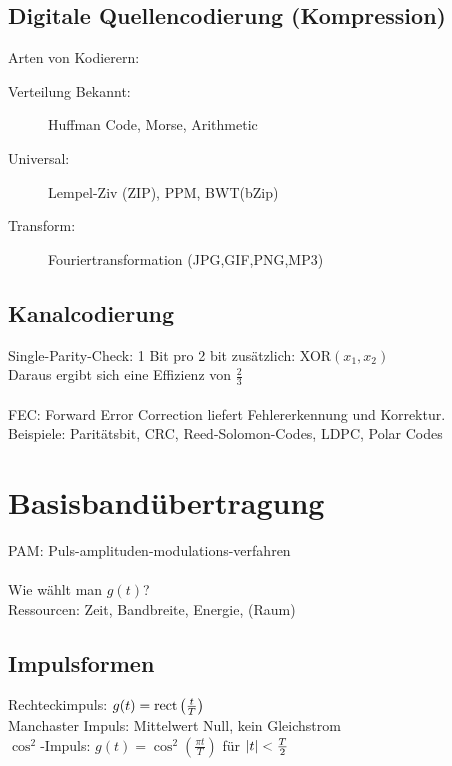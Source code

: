 \documentclass[fs, footer]{latex4ei}
\begin{document}
\begin{multicols*}{4}
	\subsection{Digitale Quellencodierung (Kompression)}
	Arten von Kodierern:
	\begin{description}
		\item[Verteilung Bekannt:] Huffman Code, Morse, Arithmetic
		\item[Universal:] Lempel-Ziv (ZIP), PPM, BWT(bZip)
		\item[Transform:] Fouriertransformation (JPG,GIF,PNG,MP3)
	\end{description}

	\subsection{Kanalcodierung}
	Single-Parity-Check: 1 Bit pro 2 bit zusätzlich: XOR$(x_1,x_2)$\\
	Daraus ergibt sich eine Effizienz von $\frac{2}{3}$\\
	\\
	FEC: Forward Error Correction liefert Fehlererkennung und Korrektur.\\
	Beispiele: Paritätsbit, CRC, Reed-Solomon-Codes, LDPC,  Polar Codes
	



\section{Basisbandübertragung}
PAM: Puls-amplituden-modulations-verfahren\\
\\
	Wie wählt man $g(t)$?\\
	Ressourcen: Zeit, Bandbreite, Energie, (Raum)\\



	\subsection{Impulsformen}
	Rechteckimpuls: $g(t) = \operatorname{rect}\left(\frac{t}{T}\right)$\\
	Manchaster Impuls: Mittelwert Null, kein Gleichstrom\\
	$\cos^2$-Impuls: $g(t) = \cos^2\left(\frac{\pi t}{T}\right)$ für $\left\vert t\right\vert < \frac{T}{2}$\\
	

\end{multicols*}
\end{document}
